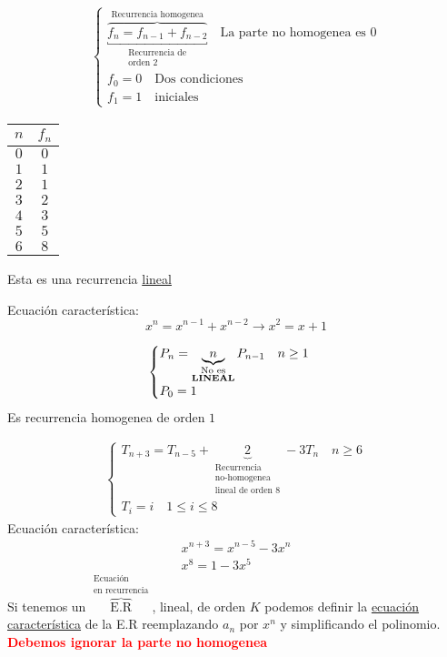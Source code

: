 \documentclass[../main.tex]{subfiles}
\begin{document}
\begin{gather*}
	\begin{cases}
		\overbrace
		{
			\underbracket
			{
				f_n = f_{n-1}+f_{n-2}
			}_
			{
				\substack
				{
					\text{Recurrencia de}\\
					\text{orden $2$}
				}
			}
		}^
		{
			\text{Recurrencia homogenea}
		}
		\quad \text{La parte no homogenea es $0$}
		\\
		f_0 = 0\quad\text{Dos condiciones}\\
		f_1 = 1\quad\text{iniciales}
	\end{cases}
\end{gather*}

\begin{center}
	\begin{tabular}{c|c}
		$n$ & $f_n$\\
		\hline
		$0$ & $0$ \\
		$1$ & $1$ \\
		$2$ & $1$ \\
		$3$ & $2$ \\
		$4$ & $3$ \\
		$5$ & $5$ \\
		$6$ & $8$
	\end{tabular}
\end{center}
Esta es una recurrencia \underline{lineal}

Ecuación característica:
\[
	x^n= x^{n-1}+x^{n-2}\rightarrow\boxed{x^2=x+1}
\]

\begin{gather*}
	\begin{cases}
		P_n =
		\underbrace
		{
			n
		}_
		{
			\substack
			{
				\text{No es}\\
				\text{\bfseries LINEAL}
			}
		}
		P_{n-1}\quad n \geq 1\\
		P_0 = 1
	\end{cases}
\end{gather*}
Es recurrencia homogenea de orden $1$

\begin{gather*}
	\begin{cases}
		T_{n+3} = T_{n-5} +
		\underbrace
		{
			2
		}_
		{
			\substack
			{
				\text{Recurrencia}\\
				\text{no-homogenea}\\
				\text{lineal de orden 8}
			}
		}
		-3T_n\quad n \geq 6\\
		T_i = i\quad 1 \leq i \leq 8
	\end{cases}
\end{gather*}
Ecuación característica:
\begin{gather*}
	x^{n+3} = x^{n-5}-3x^n\\
	x^8 = 1-3x^5
\end{gather*}
Si tenemos un $\overbrace{\text{E.R}}^{\substack{\text{Ecuación}\\\text{en recurrencia}} }$,
lineal, de orden $K$ podemos definir la \underline{ecuación característica}
de la E.R reemplazando $a_n$ por $x^n$ y simplificando el polinomio.
\textcolor{red}{\bfseries Debemos ignorar la parte no homogenea}
\end{document}

